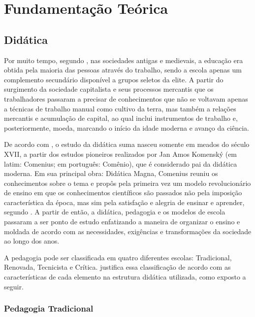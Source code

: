 \chapter{Fundamentação Teórica}
\label{chap:concep}

\section{Didática}\label{sec:didatica}

Por muito tempo, segundo \cite{saviani}, nas sociedades antigas e medievais, a educação era obtida pela maioria das pessoas através do trabalho, sendo a escola apenas um complemento secundário disponível a grupos seletos da elite. A partir do surgimento da sociedade capitalista e seus processos mercantis que os trabalhadores passaram a precisar de conhecimentos que não se voltavam apenas a técnicas de trabalho manual como cultivo da terra, mas também a relações mercantis e acumulação de capital, ao qual inclui instrumentos de trabalho e, posteriormente, moeda, marcando o início da idade moderna e avanço da ciência.

De acordo com \cite{larchert}, o estudo da didática suma nasceu somente em meados do século XVII, a partir dos estudos pioneiros realizados por Jan Amos Komenský (em latim: Comenius; em português: Comênio), que é considerado pai da didática moderna. Em sua principal obra: Didática Magna, Comenius reuniu os conhecimentos sobre o tema e propôs pela primeira vez um modelo revolucionário de ensino em que os conhecimentos científicos são passados não pela imposição característica da época, mas sim pela satisfação e alegria de ensinar e aprender, segundo \cite{gasparin}. A partir de então, a didática, pedagogia e os modelos de escola passaram a ser ponto de estudo enfatizando a maneira de organizar o ensino e moldada de acordo com as necessidades, exigências e transformações da sociedade ao longo dos anos.

A pedagogia pode ser classificada em quatro diferentes escolas:  Tradicional, Renovada, Tecnicista e Crítica. \cite{larchert} justifica essa classificação de acordo com as características de cada elemento na estrutura didática utilizada, como exposto a seguir.

\subsection{Pedagogia Tradicional}\label{sec:ped_trad}

